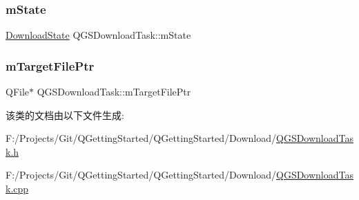 \subsubsection{\texorpdfstring{m\+State}{mState}}
{\footnotesize\ttfamily \mbox{\hyperlink{_q_g_s_download_task_8h_a94e6cd327cf2fc9490b4c797c7023a6e}{Download\+State}} Q\+G\+S\+Download\+Task\+::m\+State\hspace{0.3cm}{\ttfamily [protected]}}

\mbox{\label{class_q_g_s_download_task_a613b5ea9be7e9b4c3fc5ec7c046f012b}} 
\subsubsection{\texorpdfstring{m\+Target\+File\+Ptr}{mTargetFilePtr}}
{\footnotesize\ttfamily Q\+File$\ast$ Q\+G\+S\+Download\+Task\+::m\+Target\+File\+Ptr\hspace{0.3cm}{\ttfamily [protected]}}



该类的文档由以下文件生成\+:\begin{DoxyCompactItemize}
\item 
F\+:/\+Projects/\+Git/\+Q\+Getting\+Started/\+Q\+Getting\+Started/\+Download/\mbox{\hyperlink{_q_g_s_download_task_8h}{Q\+G\+S\+Download\+Task.\+h}}\item 
F\+:/\+Projects/\+Git/\+Q\+Getting\+Started/\+Q\+Getting\+Started/\+Download/\mbox{\hyperlink{_q_g_s_download_task_8cpp}{Q\+G\+S\+Download\+Task.\+cpp}}\end{DoxyCompactItemize}
